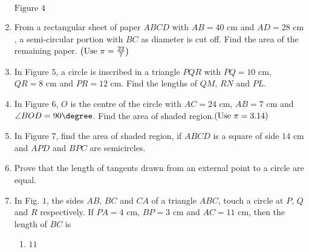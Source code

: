 \begin{enumerate}
\begin{figure}[ht]
\end{figure}
\begin{center}
$\text{Figure } 4$
\end{center}
\item From a rectangular sheet of paper $ABCD$ with $AB = 40 \text{ cm}$ and $AD = 28 \text{ cm}$, a semi-circular portion with $BC$ as diameter is cut off. Find the area of the remaining paper. $\left(\text{Use } \pi = \frac{22}{7}\right)$\\
\item In Figure $5$, a circle is inscribed in a triangle $PQR$ with $PQ = 10 \text{ cm}$, $QR = 8 \text{ cm}$ and $PR = 12 \text{ cm}$. Find the lengths of $QM$, $RN$ and $PL$.\\
\item In Figure $6$, $O$ is the centre of the circle with $AC = 24 \text{ cm}$, $AB = 7 \text{ cm}$ and $\angle BOD = 90\degree$. Find the area of shaded region.$\left(\text{Use } \pi = 3.14\right)$\\
\item In Figure $7$, find the area of shaded region, if $ABCD$ is a square of side $14 \text{ cm}$ and $APD$ and $BPC$ are semicircles.\\
\item Prove that the length of tangents drawn from an external point to a circle are equal.\\
\item In Fig. $1$, the sides $AB$, $BC$ and $CA$ of a triangle $ABC$, touch a circle at $P$, $Q$ and $R$ respectively. If $PA = 4\text{ cm}$, $BP = 3\text{ cm}$ and $AC = 11\text{ cm}$, then the length of $BC$  is\\
\begin{enumerate}
\item $11$\\

\end{enumerate}
\end{enumerate}
